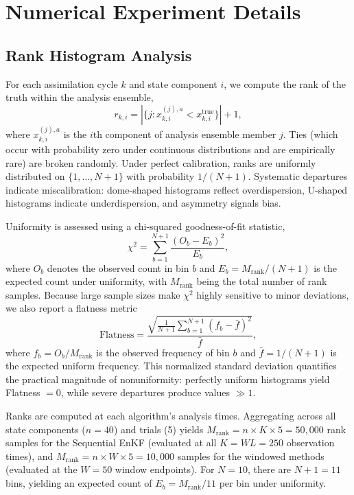 \documentclass[11pt,a4paper]{article}
\begin{document}
\FloatBarrier


\section{Numerical Experiment Details}\label{app:experiment_details}

\subsection{Rank Histogram Analysis}\label{subsec:rank_histograms}


For each assimilation cycle $k$ and state component $i$, we compute the rank of the truth within the analysis ensemble,
\begin{equation}
r_{k,i}
=
\left|\{j : x_{k,i}^{(j),a} < x_{k,i}^{\mathrm{true}}\}\right| + 1,
\label{eq:rank}
\end{equation}
where $x_{k,i}^{(j),a}$ is the $i$th component of analysis ensemble member $j$. Ties (which occur with probability zero under continuous distributions and are empirically rare) are broken randomly. Under perfect calibration, ranks are uniformly distributed on $\{1,\ldots,N+1\}$ with probability $1/(N+1)$. Systematic departures indicate miscalibration: dome-shaped histograms reflect overdispersion, U-shaped histograms indicate underdispersion, and asymmetry signals bias.

Uniformity is assessed using a chi-squared goodness-of-fit statistic,
\begin{equation}
\chi^2 = \sum_{b=1}^{N+1}\frac{(O_b - E_b)^2}{E_b},
\label{eq:chi_squared}
\end{equation}
where $O_b$ denotes the observed count in bin $b$ and $E_b = M_{\mathrm{rank}}/(N+1)$ is the expected count under uniformity, with $M_{\mathrm{rank}}$ being the total number of rank samples. Because large sample sizes make $\chi^2$ highly sensitive to minor deviations, we also report a flatness metric
\begin{equation}
\text{Flatness} = \frac{\sqrt{\frac{1}{N+1}\sum_{b=1}^{N+1}(f_b - \bar{f})^2}}{\bar{f}},
\label{eq:flatness}
\end{equation}
where $f_b = O_b / M_{\mathrm{rank}}$ is the observed frequency of bin $b$ and $\bar{f} = 1/(N+1)$ is the expected uniform frequency. This normalized standard deviation quantifies the practical magnitude of nonuniformity: perfectly uniform histograms yield Flatness $= 0$, while severe departures produce values $\gg 1$.

Ranks are computed at each algorithm's analysis times. Aggregating across all state components ($n=40$) and trials (5) yields $M_{\mathrm{rank}}=n \times K \times 5 = 50{,}000$ rank samples for the Sequential EnKF (evaluated at all $K=WL=250$ observation times), and $M_{\mathrm{rank}}=n \times W \times 5 = 10{,}000$ samples for the windowed methods (evaluated at the $W=50$ window endpoints). For $N=10$, there are $N+1=11$ bins, yielding an expected count of $E_b=M_{\mathrm{rank}}/11$ per bin under uniformity.
\end{document}
